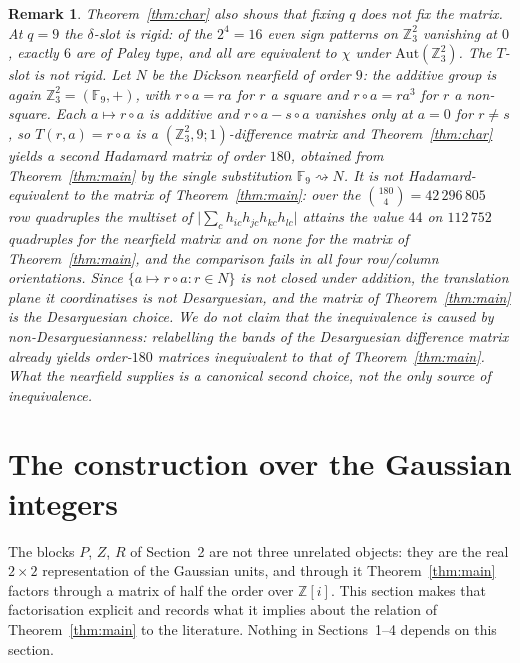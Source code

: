 \documentclass[11pt]{article}
\newtheorem{remark}{Remark}
\newcommand{\F}{\mathbb F}
\newcommand{\Z}{\mathbb Z}
\begin{document}
\begin{remark}\label{rem:q9}
Theorem~\ref{thm:char} also shows that fixing \(q\) does not fix the matrix.
At \(q=9\) the \(\delta\)-slot is rigid: of the \(2^{4}=16\) even sign
patterns on \(\Z_3^{2}\) vanishing at \(0\), exactly \(6\) are of Paley type,
and all are equivalent to \(\chi\) under \(\mathrm{Aut}(\Z_3^{2})\).  The
\(T\)-slot is not rigid.  Let \(N\) be the Dickson nearfield of order \(9\):
the additive group is again \(\Z_3^{2}=(\F_9,+)\), with
\(r\circ a=ra\) for \(r\) a square and \(r\circ a=ra^{3}\) for \(r\) a
non-square.  Each \(a\mapsto r\circ a\) is additive and \(r\circ a-s\circ a\)
vanishes only at \(a=0\) for \(r\neq s\), so \(T(r,a)=r\circ a\) is a
\((\Z_3^{2},9;1)\)-difference matrix and Theorem~\ref{thm:char} yields a
second Hadamard matrix of order \(180\), obtained from Theorem~\ref{thm:main}
by the single substitution \(\F_9\rightsquigarrow N\).  It is not
Hadamard-equivalent to the matrix of Theorem~\ref{thm:main}: over the
\(\binom{180}{4}=42\,296\,805\) row quadruples the multiset of
\(\bigl|\sum_ch_{ic}h_{jc}h_{kc}h_{lc}\bigr|\) attains the value \(44\) on
\(112\,752\) quadruples for the nearfield matrix and on none for the matrix of
Theorem~\ref{thm:main}, and the comparison fails in all four row/column
orientations.  Since \(\{a\mapsto r\circ a: r\in N\}\) is not closed under
addition, the translation plane it coordinatises is not Desarguesian, and
the matrix of Theorem~\ref{thm:main} is the Desarguesian choice.  We do not
claim that the inequivalence is \emph{caused} by non-Desarguesianness:
relabelling the bands of the Desarguesian difference matrix already yields
order-\(180\) matrices inequivalent to that of Theorem~\ref{thm:main}.
What the nearfield supplies is a canonical second choice, not the only
source of inequivalence.
\end{remark}

\section{The construction over the Gaussian integers}
\label{sec:gaussian}

The blocks \(P\), \(Z\), \(R\) of Section~2 are not three unrelated objects: they
are the real \(2\times2\) representation of the Gaussian units, and through
it Theorem~\ref{thm:main} factors through a matrix of half the order over
\(\Z[i]\).  This section makes that factorisation explicit and records what
it implies about the relation of Theorem~\ref{thm:main} to the literature.
Nothing in Sections~1--4 depends on this section.
\end{document}
